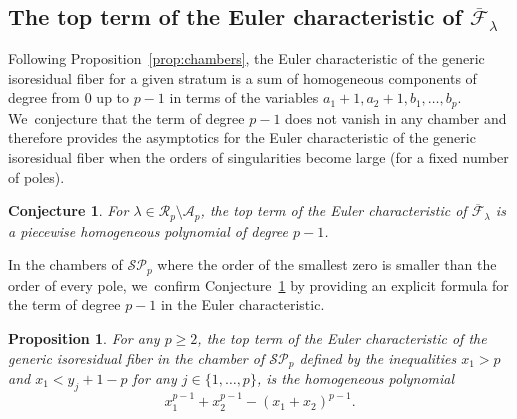 \documentclass[JEP,XML,SOM,Unicode,NoFloatCountersInSection,published]{cedram}
\newtheorem{prop}[thm]{Proposition}
\newtheorem{conj}[thm]{Conjecture}
\theoremstyle{definition}
\begin{document}
\subsection{The top term of the Euler characteristic of $\overline{\mathcal F}_\lambda$}\label{sub:Euler}

Following Proposition~\ref{prop:chambers}, the Euler characteristic of the generic isoresidual fiber for a given stratum is a sum of homogeneous components of degree from $0$ up to $p-1$ in terms of the variables $a_{1}+1,a_{2}+1,b_{1},\dots,b_{p}$. We~conjecture that the term of degree $p-1$ does not vanish in any chamber and therefore provides the asymptotics for the Euler characteristic of the generic isoresidual fiber when the orders of singularities become large (for a fixed number of poles).

\begin{conj}\label{conj:Euler}
For $\lambda \in \mathcal{R}_{p} \setminus \mathcal{A}_{p}$, the top term of the Euler characteristic of $\overline{\mathcal F}_\lambda$ is a piecewise homogeneous polynomial of degree $p-1$.
\end{conj}

In the chambers of $\mathcal{SP}_{p}$ where the order of the smallest zero is smaller than the order of every pole, we~confirm Conjecture~\ref{conj:Euler} by providing an explicit formula for the term of degree $p-1$ in the Euler characteristic.

\begin{prop}
\label{prop:one-chamber}
For any $p \geq 2$, the top term of the Euler characteristic of the generic isoresidual fiber in the chamber of $\mathcal{SP}_{p}$ defined by the inequalities $x_{1}>p$ and $x_{1}<y_{j} +1-p$ for any $j \in \lbrace{ 1,\dots,p \rbrace}$, is the homogeneous polynomial
\[
x_{1}^{p-1}+x_{2}^{p-1}-(x_{1}+x_{2})^{p-1}.
\]
\end{prop}
\end{document}
